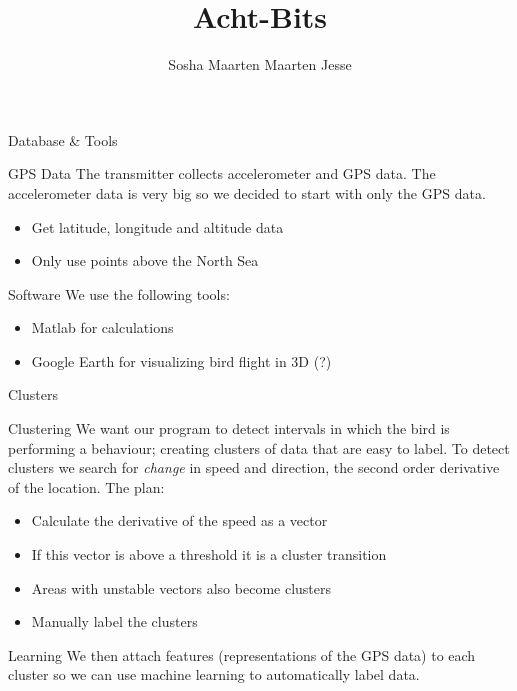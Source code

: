 \documentclass{beamer}
\title{Acht-Bits \\ \small }
\author{Sosha Maarten Maarten Jesse}
\institute{UvA}
\begin{document}
\maketitle

\begin{frame}{Database \& Tools}

\begin{block}{GPS Data}
The transmitter collects accelerometer and GPS data. The accelerometer data is very big so we decided to start with only the GPS data.
\begin{itemize}
\item Get latitude, longitude and altitude data
\item Only use points above the North Sea
\end{itemize}
\end{block}

\begin{block}{Software}
We use the following tools:
\begin{itemize}
\item Matlab for calculations
\item Google Earth for visualizing bird flight in 3D (?)
\end{itemize}
\end{block}

\end{frame}

\begin{frame}{Clusters}
\begin{block}{Clustering}
We want our program to detect intervals in which the bird is performing a behaviour; creating clusters of data that are easy to label. 
To detect clusters we search for \emph{change} in speed and direction, the second order derivative of the location. The plan:
\begin{itemize}
\item Calculate the derivative of the speed as a vector
\item If this vector is above a threshold it is a cluster transition
\item Areas with unstable vectors also become clusters
\item Manually label the clusters
\end{itemize}
\end{block}

\begin{block}{Learning}
We then attach features (representations of the GPS data) to each cluster so we can use machine learning to automatically label data.
\end{block}

\end{frame}
\end{document}
